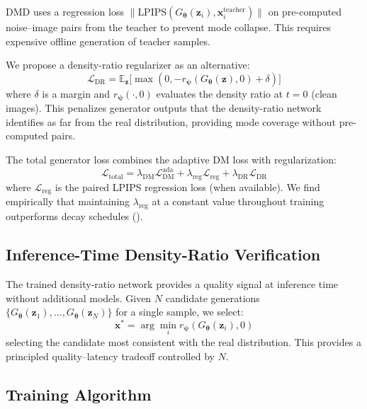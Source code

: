 \documentclass{article}
\theoremstyle{plain}
\theoremstyle{remark}
\newcommand{\E}{\mathbb{E}}
\newcommand{\bx}{\mathbf{x}}
\newcommand{\bz}{\mathbf{z}}
\newcommand{\btheta}{\boldsymbol{\theta}}
\newcommand{\bpsi}{\boldsymbol{\psi}}
\begin{document}
DMD uses a regression loss $\|\text{LPIPS}(G_{\btheta}(\bz_i), \bx_i^{\text{teacher}})\|$ on pre-computed noise--image pairs from the teacher to prevent mode collapse. This requires expensive offline generation of teacher samples.

We propose a density-ratio regularizer as an alternative:
\begin{equation}
\mathcal{L}_{\text{DR}} = \E_{\bz}\bigl[\max(0, -r_{\bpsi}(G_{\btheta}(\bz), 0) + \delta)\bigr]
\label{eq:dr_loss}
\end{equation}
where $\delta$ is a margin and $r_{\bpsi}(\cdot, 0)$ evaluates the density ratio at $t = 0$ (clean images). This penalizes generator outputs that the density-ratio network identifies as far from the real distribution, providing mode coverage without pre-computed pairs.

The total generator loss combines the adaptive DM loss with regularization:
\begin{equation}
\mathcal{L}_{\text{total}} = \lambda_{\text{DM}} \mathcal{L}_{\text{DM}}^{\text{ada}} + \lambda_{\text{reg}} \mathcal{L}_{\text{reg}} + \lambda_{\text{DR}} \mathcal{L}_{\text{DR}}
\label{eq:total_loss}
\end{equation}
where $\mathcal{L}_{\text{reg}}$ is the paired LPIPS regression loss (when available). We find empirically that maintaining $\lambda_{\text{reg}}$ at a constant value throughout training outperforms decay schedules ().

\subsection{Inference-Time Density-Ratio Verification}
\label{sec:dr_verify}

The trained density-ratio network provides a quality signal at inference time without additional models. Given $N$ candidate generations $\{G_{\btheta}(\bz_1), \ldots, G_{\btheta}(\bz_N)\}$ for a single sample, we select:
\begin{equation}
\bx^* = \arg\min_{i} r_{\bpsi}(G_{\btheta}(\bz_i), 0)
\label{eq:verify}
\end{equation}
selecting the candidate most consistent with the real distribution. This provides a principled quality--latency tradeoff controlled by $N$.

\subsection{Training Algorithm}
\label{sec:algorithm}
\end{document}
